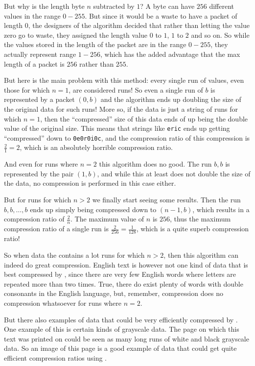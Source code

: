 But why is the length byte $n$ subtracted by $1$?  A byte can have
$256$ different values in the range $0-255$. But since it would be a
waste to have a packet of length $0$, the designers of the algorithm
decided that rather than letting the value zero go to waste, they
assigned the length value $0$ to $1$, $1$ to $2$ and so on. So while
the values stored in the length of the packet are in the range
$0-255$, they actually represent range $1-256$, which has the added
advantage that the max length of a packet is $256$ rather than $255$.

But here is the main problem with this method: every single run of
values, even those for which $n=1$, are considered runs! So even a
single run of $b$ is represented by a packet $(0,b)$ and the algorithm
ends up doubling the size of the original data for such runs! More so,
if the data is just a string of runs for which $n=1$, then the
``compressed'' size of this data ends of up being the double value of
the original size. This means that strings like \texttt{eric} ends up
getting ``compressed'' down to \texttt{0e0r0i0c}, and the compression ratio
of this compression is $\frac{2}{1} = 2$, which is an absolutely
horrible compression ratio.

And even for runs where $n=2$ this algorithm does no good. The run
$b,b$ is represented by the pair $(1,b)$, and while this at least
does not double the size of the data, no compression is performed in
this case either.

But for runs for which $n > 2$ we finally start seeing some
results. Then the run $b, b, \dots, b$ ends up simply being compressed
down to $(n-1,b)$, which results in a compression ratio of
$\frac{2}{n}$. The maximum value of $n$ is $256$, thus the maximum
compression ratio of a single run is $\frac{2}{256} = \frac{1}{128}$,
which is a quite superb compression ratio!

So when data the contains a lot runs for which $n > 2$, then this
algorithm can indeed do great compression. English text is however not
one kind of data that is best compressed by \rle, since there are very
few English words where letters are repeated more than two
times. True, there do exist plenty of words with double consonants in
the English language, but, remember, \rle compression does no
compression whatsoever for runs where $n=2$.

But there also examples of data that could be very efficiently
compressed by \rle. One example of this is certain kinds of grayscale
data. The page on which this text was printed on could be seen as many
long runs of white and black grayscale data. So an image of this page
is a good example of data that could get quite efficient compression
ratios using \rle.


